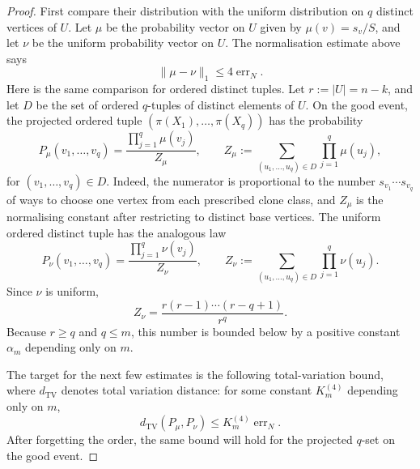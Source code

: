 \documentclass[11pt]{article}
\theoremstyle{definition}
\begin{document}
\begin{proof}
First compare their distribution with the uniform distribution on $q$ distinct
vertices of $U$.  Let $\mu$ be the probability vector on $U$ given by
$\mu(v)=s_v/S$, and let $\nu$ be the uniform probability vector on $U$.  The
normalisation estimate above says
\[
  \|\mu-\nu\|_1\le 4\operatorname{err}_N .
\]
Here is the same comparison for ordered distinct tuples.  Let $r:=|U|=n-k$, and
let $D$ be the set of ordered $q$-tuples of distinct elements of $U$.  On the
good event, the projected ordered tuple $(\pi(X_1),\ldots,\pi(X_q))$ has the
probability
\[
  P_\mu(v_1,\ldots,v_q)
  =
  \frac{\prod_{j=1}^q \mu(v_j)}
       {Z_\mu},
  \qquad
  Z_\mu:=\sum_{(u_1,\ldots,u_q)\in D}\prod_{j=1}^q \mu(u_j),
\]
for $(v_1,\ldots,v_q)\in D$.  Indeed, the numerator is proportional to the
number $s_{v_1}\cdots s_{v_q}$ of ways to choose one vertex from each prescribed
clone class, and $Z_\mu$ is the normalising constant after restricting to
distinct base vertices.  The uniform ordered distinct tuple has the analogous law
\[
  P_\nu(v_1,\ldots,v_q)
  =
  \frac{\prod_{j=1}^q \nu(v_j)}
       {Z_\nu},
  \qquad
  Z_\nu:=\sum_{(u_1,\ldots,u_q)\in D}\prod_{j=1}^q \nu(u_j).
\]
Since $\nu$ is uniform,
\[
  Z_\nu=\frac{r(r-1)\cdots(r-q+1)}{r^q}.
\]
Because $r\ge q$ and $q\le m$, this number is bounded below by a positive
constant $\alpha_m$ depending only on $m$.

The target for the next few estimates is the following total-variation bound,
where $d_{\mathrm{TV}}$ denotes total variation distance: for some constant
$K_m^{(4)}$ depending only on $m$,
\begin{equation}\label{eq:ordered-good-tv-target}
  d_{\mathrm{TV}}(P_\mu,P_\nu)\le K_m^{(4)}\operatorname{err}_N .
\end{equation}
After forgetting the order, the same bound will hold for the projected $q$-set
on the good event.


\end{proof}
\end{document}
